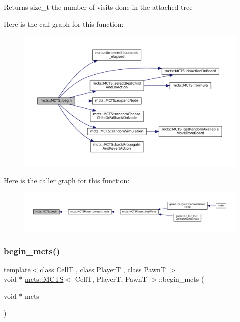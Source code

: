 \begin{DoxyReturn}{Returns}
size\+\_\+t the number of visits done in the attached tree 
\end{DoxyReturn}
Here is the call graph for this function\+:
\nopagebreak
\begin{figure}[H]
\begin{center}
\leavevmode
\includegraphics[width=350pt]{classmcts_1_1_m_c_t_s_ae8b2818e7a34e858e9dd284d33bca874_cgraph}
\end{center}
\end{figure}
Here is the caller graph for this function\+:
\nopagebreak
\begin{figure}[H]
\begin{center}
\leavevmode
\includegraphics[width=350pt]{classmcts_1_1_m_c_t_s_ae8b2818e7a34e858e9dd284d33bca874_icgraph}
\end{center}
\end{figure}
\mbox{\label{classmcts_1_1_m_c_t_s_ab1b102cd67bb285c669f3fbb405ef5aa}} 
\subsubsection{\texorpdfstring{begin\+\_\+mcts()}{begin\_mcts()}}
{\footnotesize\ttfamily template$<$class CellT , class PlayerT , class PawnT $>$ \\
void $\ast$ \hyperlink{classmcts_1_1_m_c_t_s}{mcts\+::\+M\+C\+TS}$<$ CellT, PlayerT, PawnT $>$\+::begin\+\_\+mcts (\begin{DoxyParamCaption}\item[{void $\ast$}]{mcts }\end{DoxyParamCaption})\hspace{0.3cm}{\ttfamily [static]}}




